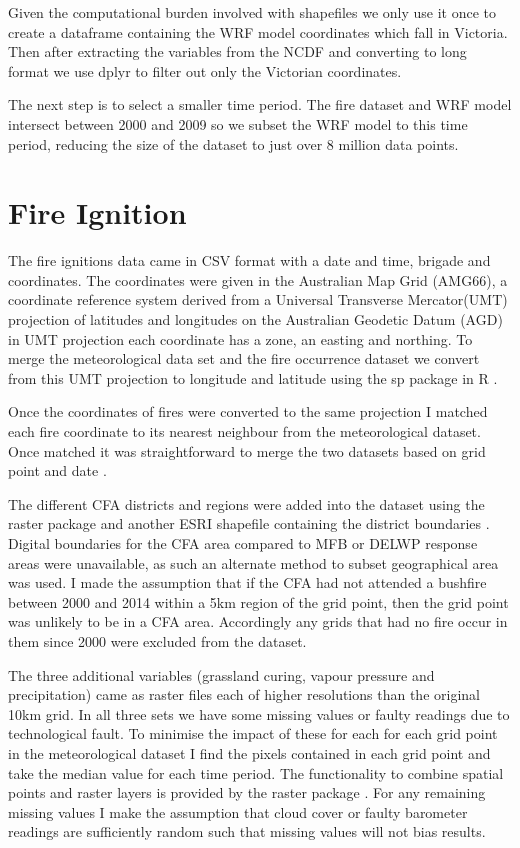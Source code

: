 \documentclass[11pt,a4paper]{article}
\begin{document}
	Given the computational burden involved with shapefiles we only use it once to create a dataframe containing the WRF model coordinates which fall in Victoria. Then after extracting the variables from the NCDF and converting to long format we use dplyr to filter out only the Victorian coordinates. 
	
	The next step is to select a smaller time period. The fire dataset and WRF model intersect between 2000 and 2009 so we subset the WRF model to this time period, reducing the size of the dataset to just over 8 million data points. 
	
	\section{Fire Ignition}
	
	The fire ignitions data came in CSV format with a date and time, brigade and coordinates. The coordinates were given in the Australian Map Grid (AMG66), a coordinate reference system derived from a Universal Transverse Mercator(UMT) projection of latitudes and longitudes on the Australian Geodetic Datum (AGD) \citep{featherstone96} in UMT projection each coordinate has a zone, an easting and northing. To merge the meteorological data set and the fire occurrence dataset we convert from this UMT projection to longitude and latitude using the sp package in R \citep{sp08}. 
	
	Once the coordinates of fires were converted to the same projection I matched each fire coordinate to its nearest neighbour from the meteorological dataset. Once matched it was straightforward to merge the two datasets based on grid point and date \citep{datatable}. 
	
	The different CFA districts and regions were added into the dataset using the raster package and another ESRI shapefile containing the district boundaries \citep{raster}. 
	Digital boundaries for the CFA area compared to MFB or DELWP response areas were unavailable, as such an alternate method to subset geographical area was used. I made the assumption that if the CFA had not attended a bushfire between 2000 and 2014 within a 5km region of the grid point, then the grid point was unlikely to be in a CFA area. Accordingly any grids that had no fire occur in them since 2000 were excluded from the dataset. 
	
	The three additional variables (grassland curing, vapour pressure and precipitation) came as raster files each of higher resolutions than the original 10km grid. In all three sets we have some missing values or faulty readings due to technological fault. To minimise the impact of these for each for each grid point in the meteorological dataset I find the pixels contained in each grid point and take the median value for each time period. The functionality to combine spatial points and raster layers is provided by the raster package \citep{raster}. For any remaining missing values I make the assumption that cloud cover or faulty barometer readings are sufficiently random such that missing values will not bias results.
	
\end{document}
